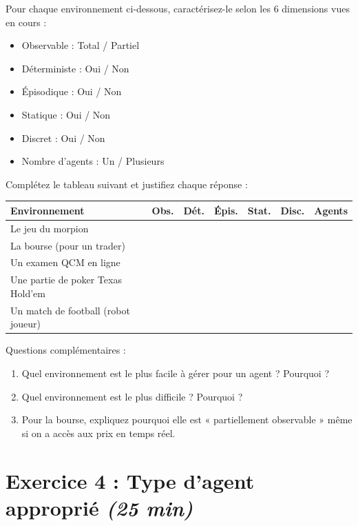 \documentclass[11pt,a4paper]{article}
\begin{document}
\begin{exercicebox}[Énoncé]
Pour chaque environnement ci-dessous, caractérisez-le selon les 6 dimensions vues en cours :
\begin{itemize}
    \item Observable : Total / Partiel
    \item Déterministe : Oui / Non
    \item Épisodique : Oui / Non
    \item Statique : Oui / Non
    \item Discret : Oui / Non
    \item Nombre d'agents : Un / Plusieurs
\end{itemize}

Complétez le tableau suivant et justifiez chaque réponse :

\begin{center}
\begin{tabular}{|l|c|c|c|c|c|c|}
\hline
\textbf{Environnement} & \textbf{Obs.} & \textbf{Dét.} & \textbf{Épis.} & \textbf{Stat.} & \textbf{Disc.} & \textbf{Agents} \\
\hline
Le jeu du morpion & & & & & & \\
\hline
La bourse (pour un trader) & & & & & & \\
\hline
Un examen QCM en ligne & & & & & & \\
\hline
Une partie de poker Texas Hold'em & & & & & & \\
\hline
Un match de football (robot joueur) & & & & & & \\
\hline
\end{tabular}
\end{center}

Questions complémentaires :
\begin{enumerate}
    \item Quel environnement est le plus facile à gérer pour un agent ? Pourquoi ?
    \item Quel environnement est le plus difficile ? Pourquoi ?
    \item Pour la bourse, expliquez pourquoi elle est « partiellement observable » même si on a accès aux prix en temps réel.
\end{enumerate}
\end{exercicebox}

\vspace{1cm}

\section*{Exercice 4 : Type d'agent approprié \hfill \textit{(25 min)}}
\end{document}
